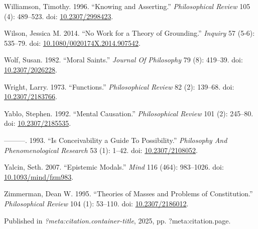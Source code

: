 \documentclass[
  10pt,
  letterpaper,
  DIV=11,
  numbers=noendperiod,
  twoside]{scrartcl}
\newlength{\cslhangindent}
\newenvironment{CSLReferences}[2] %
 {\begin{list}{}{%
  \setlength{\itemindent}{0pt}
  \setlength{\leftmargin}{0pt}
  \setlength{\parsep}{0pt}
  \ifodd #1
   \setlength{\leftmargin}{\cslhangindent}
   \setlength{\itemindent}{-1\cslhangindent}
  \fi
  \setlength{\itemsep}{#2\baselineskip}}}
 {\end{list}}
\begin{document}
\begin{CSLReferences}{1}{0}
Williamson, Timothy. 1996. {``Knowing and Asserting.''}
\emph{Philosophical Review} 105 (4): 489--523. doi:
\href{https://doi.org/10.2307/2998423}{10.2307/2998423}.

Wilson, Jessica M. 2014. {``No Work for a Theory of Grounding.''}
\emph{Inquiry} 57 (5-6): 535--79. doi:
\href{https://doi.org/10.1080/0020174X.2014.907542}{10.1080/0020174X.2014.907542}.

Wolf, Susan. 1982. {``Moral Saints.''} \emph{Journal Of Philosophy} 79
(8): 419--39. doi:
\href{https://doi.org/10.2307/2026228}{10.2307/2026228}.

Wright, Larry. 1973. {``Functions.''} \emph{Philosophical Review} 82
(2): 139--68. doi:
\href{https://doi.org/10.2307/2183766}{10.2307/2183766}.

Yablo, Stephen. 1992. {``Mental Causation.''} \emph{Philosophical
Review} 101 (2): 245--80. doi:
\href{https://doi.org/10.2307/2185535}{10.2307/2185535}.

---------. 1993. {``Is Conceivability a Guide To Possibility.''}
\emph{Philosophy And Phenomenological Research} 53 (1): 1--42. doi:
\href{https://doi.org/10.2307/2108052}{10.2307/2108052}.

Yalcin, Seth. 2007. {``Epistemic Modals.''} \emph{Mind} 116 (464):
983--1026. doi:
\href{https://doi.org/10.1093/mind/fzm983}{10.1093/mind/fzm983}.

Zimmerman, Dean W. 1995. {``Theories of Masses and Problems of
Constitution.''} \emph{Philosophical Review} 104 (1): 53--110. doi:
\href{https://doi.org/10.2307/2186012}{10.2307/2186012}.

\end{CSLReferences}



\noindent Published in\emph{
?meta:citation.container-title}, 2025, pp. ?meta:citation.page.
\end{document}
